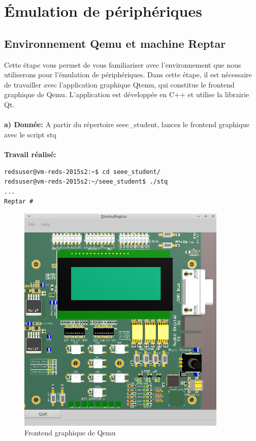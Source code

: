 \newpage
\section{Émulation de périphériques}
\subsection{Environnement Qemu et machine Reptar}
Cette étape vous permet de vous familiariser avec l’environnement que nous utiliserons pour
l’émulation de périphériques.
Dans cette étape, il est nécessaire de travailler avec l'application graphique Qtemu, qui constitue le
frontend graphique de Qemu. L'application est développée en C++ et utilise la librairie Qt. \\\\
\textbf{a) Donnée: }A partir du répertoire seee\_student, lancez le frontend graphique avec le script stq \\\\
\textbf{Travail réalisé: }
\begin{lstlisting}
redsuser@vm-reds-2015s2:~$ cd seee_student/
redsuser@vm-reds-2015s2:~/seee_student$ ./stq
...
Reptar # 
\end{lstlisting}
\begin{figure}[H]
	\begin{center}
		\includegraphics[width=10cm]{img/emulation1.png}
		\caption{Frontend graphique de Qemu}
		\label{emulation1}
	\end{center}
\end{figure}
